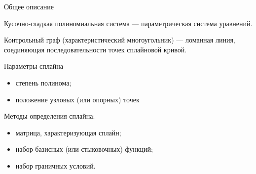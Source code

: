 \documentclass{beamer}
\begin{document}
	\begin{frame}{Общее описание}


		Кусочно-гладкая полиномиальная система --- параметрическая система уравнений.

		Контрольный граф (характеристический многоугольник) --- ломанная линия, соединяющая последовательности точек сплайновой кривой.

		Параметры сплайна
		\begin{itemize}
			\item степень полинома;
			\item положение узловых (или опорных) точек 
		\end{itemize}

		Методы определения сплайна:
		\begin{itemize}
			\item матрица, характеризующая сплайн;
			\item набор базисных (или стыковочных) функций;
			\item набор граничных условий.
		\end{itemize}


	\end{frame}
\end{document}
